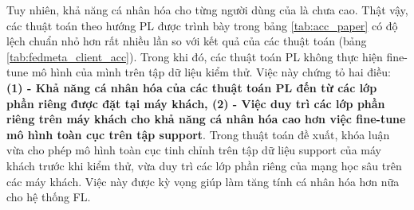 Tuy nhiên, khả năng cá nhân hóa cho từng người dùng của  là chưa cao. Thật vậy, các thuật toán theo hướng PL được trình bày trong bảng \ref{tab:acc_paper} có độ lệch chuẩn nhỏ hơn rất nhiều lần so với kết quả của các thuật toán  (bảng \ref{tab:fedmeta_client_acc}). Trong khi đó, các thuật toán PL không thực hiện fine-tune mô hình của mình trên tập dữ liệu kiểm thử. Việc này chứng tỏ hai điều: \textbf{(1) - Khả năng cá nhân hóa của các thuật toán PL đến từ các lớp phần riêng được đặt tại máy khách, (2) - Việc duy trì các lớp phần riêng trên máy khách cho khả năng cá nhân hóa cao hơn việc fine-tune mô hình toàn cục trên tập support}. Trong thuật toán đề xuất, khóa luận vừa cho phép mô hình toàn cục tinh chỉnh trên tập dữ liệu support của máy khách trước khi kiểm thử, vừa duy trì các lớp phần riêng của mạng học sâu trên các máy khách. Việc này được kỳ vọng giúp làm tăng tính cá nhân hóa hơn nữa cho hệ thống FL.

\begin{table}[H]
    \centering
    \caption{Bảng độ chính xác (\%) của thuật toán FedAvg và các thuật toán FedMeta tính trên máy khách (dữ liệu Non-IID)}
    \label{tab:fedmeta_client_acc}
\end{table}

